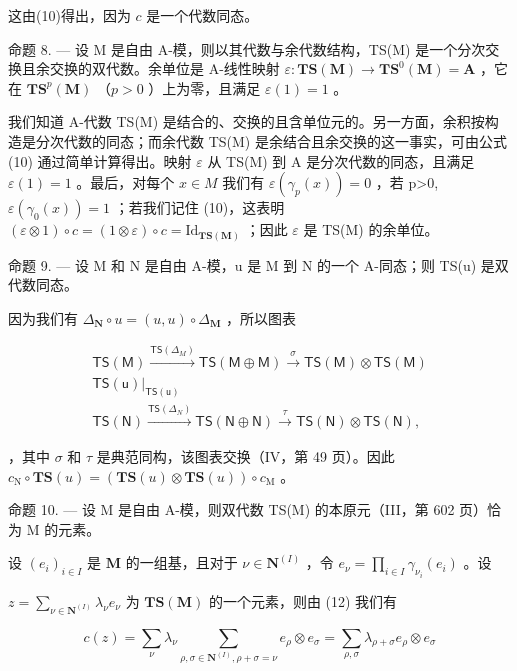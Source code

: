 这由(10)得出，因为 \(c\) 是一个代数同态。

命题 8. --- 设 M 是自由 A-模，则以其代数与余代数结构，TS(M) 是一个分次交换且余交换的双代数。余单位是 A-线性映射 \(\varepsilon: \mathbf{TS}(\mathbf{M}) \to \mathbf{TS}^0(\mathbf{M}) = \mathbf{A}\) ，它在 \(\mathbf{TS}^p(\mathbf{M})\) （\(p > 0\) ）上为零，且满足 \(\varepsilon(1) = 1\) 。

我们知道 A-代数 TS(M) 是结合的、交换的且含单位元的。另一方面，余积按构造是分次代数的同态；而余代数 TS(M) 是余结合且余交换的这一事实，可由公式 (10) 通过简单计算得出。映射 \(\varepsilon\) 从 TS(M) 到 A 是分次代数的同态，且满足 \(\varepsilon(1)=1\) 。最后，对每个 \(x\in M\) 我们有 \(\varepsilon(\gamma_{p}(x))=0\) ，若 p\textgreater0, \(\varepsilon(\gamma_{0}(x))=1\) ；若我们记住 (10)，这表明 \((\varepsilon\otimes1)\circ c=(1\otimes\varepsilon)\circ c=\mathrm{Id}_{\mathbf{TS}(\mathbf{M})}\) ；因此 \(\varepsilon\) 是 TS(M) 的余单位。

命题 9. --- 设 M 和 N 是自由 A-模，u 是 M 到 N 的一个 A-同态；则 TS(u) 是双代数同态。

因为我们有 \(\Delta_{\mathbf{N}} \circ u = (u, u) \circ \Delta_{\mathbf{M}}\) ，所以图表

\[
\begin{array}{c} \mathsf {T S (M)} \xrightarrow {\mathsf {T S} (\Delta_ {M})} \mathsf {T S (M \oplus M)} \xrightarrow {\sigma} \mathsf {T S (M)} \otimes \mathsf {T S (M)} \\ \mathsf {T S (u)} \Bigg | _ {\mathsf {T S (u)}} \\ \mathsf {T S (N)} \xrightarrow {\mathsf {T S} (\Delta_ {N})} \mathsf {T S (N \oplus N)} \xrightarrow {\tau} \mathsf {T S (N)} \otimes \mathsf {T S (N)}, \end{array}
\]

，其中 \(\sigma\) 和 \(\tau\) 是典范同构，该图表交换（IV，第 49 页）。因此 \(c_{\mathrm{N}} \circ \mathbf{T}\mathbf{S}(u) = (\mathbf{T}\mathbf{S}(u) \otimes \mathbf{T}\mathbf{S}(u)) \circ c_{\mathrm{M}}\) 。

命题 10. --- 设 M 是自由 A-模，则双代数 TS(M) 的本原元（III，第 602 页）恰为 M 的元素。

设 \((e_i)_{i\in I}\) 是 \(\mathbf{M}\) 的一组基，且对于 \(\nu \in \mathbf{N}^{(I)}\) ，令 \(e_{\nu} = \prod_{i\in I}\gamma_{\nu_i}(e_i)\) 。设

\(z = \sum_{\nu \in \mathbf{N}^{(I)}} \lambda_{\nu} e_{\nu}\) 为 \(\mathbf{T}\mathbf{S}(\mathbf{M})\) 的一个元素，则由 (12) 我们有

\[
c (z) = \sum_ {\nu} \lambda_ {\nu} \sum_ {\rho , \sigma \in \mathbf {N} ^ {(I)}, \rho + \sigma = \nu} e _ {\rho} \otimes e _ {\sigma} = \sum_ {\rho , \sigma} \lambda_ {\rho + \sigma} e _ {\rho} \otimes e _ {\sigma}
\]

